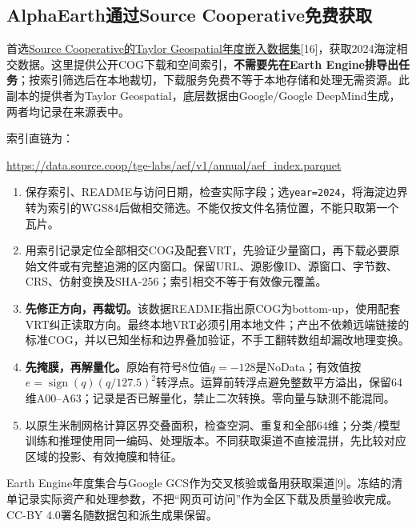 \documentclass[12pt,a4paper,fontset=fandol]{ctexart}
\newcommand{\file}[1]{\nolinkurl{#1}}
\begin{document}
\subsection{AlphaEarth通过Source Cooperative免费获取}
首选\href{https://source.coop/tge-labs/aef}{Source Cooperative的Taylor Geospatial年度嵌入数据集}[16]，获取2024海淀相交数据。这里提供公开COG下载和空间索引，\textbf{不需要先在Earth Engine排导出任务}；按索引筛选后在本地裁切，下载服务免费不等于本地存储和处理无需资源。此副本的提供者为Taylor Geospatial，底层数据由Google/Google DeepMind生成，两者均记录在来源表中。

索引直链为：

\url{https://data.source.coop/tge-labs/aef/v1/annual/aef_index.parquet}

\begin{enumerate}
\item 保存索引、README与访问日期，检查实际字段；选\file{year=2024}，将海淀边界转为索引的WGS84后做相交筛选。不能仅按文件名猜位置，不能只取第一个瓦片。
\item 用索引记录定位全部相交COG及配套VRT，先验证少量窗口，再下载必要原始文件或有完整追溯的区内窗口。保留URL、源影像ID、源窗口、字节数、CRS、仿射变换及SHA-256；索引相交不等于有效像元覆盖。
\item \textbf{先修正方向，再裁切。}该数据README指出原COG为bottom-up，使用配套VRT纠正读取方向。最终本地VRT必须引用本地文件；产出不依赖远端链接的标准COG，并以已知坐标和边界叠加验证，不手工翻转数组却漏改地理变换。
\item \textbf{先掩膜，再解量化。}原始有符号8位值$q=-128$是NoData；有效值按$e=\operatorname{sign}(q)(q/127.5)^2$转浮点。运算前转浮点避免整数平方溢出，保留64维A00--A63；记录是否已解量化，禁止二次转换。零向量与缺测不能混同。
\item 以原生米制网格计算区界交叠面积，检查空洞、重复和全部64维；分类/模型训练和推理使用同一编码、处理版本。不同获取渠道不直接混拼，先比较对应区域的投影、有效掩膜和特征。
\end{enumerate}
Earth Engine年度集合与Google GCS作为交叉核验或备用获取渠道[9]。冻结的清单记录实际资产和处理参数，不把“网页可访问”作为全区下载及质量验收完成。CC-BY 4.0署名随数据包和派生成果保留。
\end{document}
